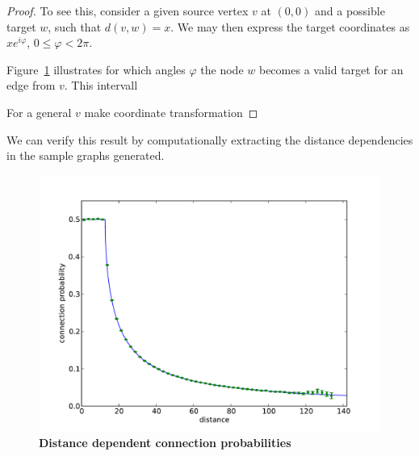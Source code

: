 \begin{proof}
  To see this, consider a given source vertex $v$ at $(0,0)$ and a
  possible target $w$, such that $d(v,w) = x$. We may then express the
  target coordinates as $x e^{i\varphi}$, $0 \le \varphi < 2\pi$.

  Figure~\ref{fig:geomtr_prb} illustrates for which angles
  $\varphi$ the node $w$ becomes a valid target for an edge from
  $v$. This intervall

  \begin{figure}[h] 
    \centering 
    \label{fig:geomtr_prb}
  \end{figure}

  For a general $v$ make coordinate transformation

\end{proof}

We can verify this result by computationally extracting the distance
dependencies in the sample graphs generated. 

\begin{figure}[h]
  \centering
  \includegraphics[width=0.7\linewidth]{gfx/plots/test.pdf}
  \caption{\textbf{Distance dependent connection probabilities}}%
  \label{fig:something_else}%
\end{figure}





